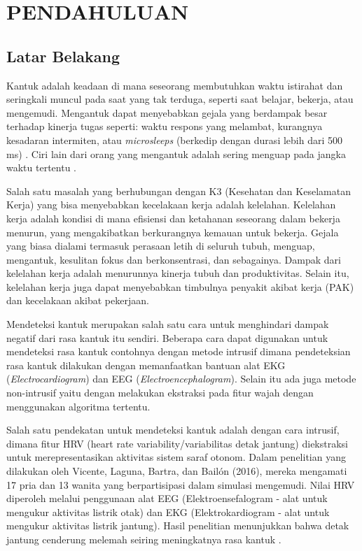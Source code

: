 \chapter{PENDAHULUAN}
\label{chap:pendahuluan}


\section{Latar Belakang}
\label{sec:latarbelakang}

Kantuk adalah keadaan di mana seseorang membutuhkan waktu istirahat dan seringkali
muncul pada saat yang tak terduga, seperti saat belajar, bekerja, atau mengemudi.
Mengantuk dapat menyebabkan gejala yang
berdampak besar terhadap kinerja tugas seperti: waktu respons
yang melambat, kurangnya kesadaran intermiten, atau \emph{microsleeps}
(berkedip dengan durasi lebih dari 500 ms) \parencite{2}. Ciri
lain dari orang yang mengantuk adalah sering menguap pada jangka
waktu tertentu \parencite{3}.

Salah satu masalah yang berhubungan dengan K3 (Kesehatan dan Keselamatan Kerja) yang bisa
menyebabkan kecelakaan kerja adalah kelelahan. Kelelahan kerja adalah kondisi di mana
efisiensi dan ketahanan seseorang dalam bekerja menurun, yang mengakibatkan
berkurangnya kemauan untuk bekerja. Gejala yang biasa dialami termasuk perasaan letih di
seluruh tubuh, menguap, mengantuk, kesulitan fokus dan berkonsentrasi, dan sebagainya.
Dampak dari kelelahan kerja adalah menurunnya kinerja tubuh dan produktivitas. Selain itu,
kelelahan kerja juga dapat menyebabkan timbulnya penyakit akibat kerja (PAK) dan
kecelakaan akibat pekerjaan\parencite{31}.

Mendeteksi kantuk merupakan salah satu cara untuk menghindari
dampak negatif dari rasa kantuk itu sendiri. Beberapa cara dapat
digunakan untuk mendeteksi rasa kantuk contohnya dengan metode
intrusif dimana pendeteksian rasa kantuk dilakukan dengan memanfaatkan
bantuan alat EKG (\emph{Electrocardiogram}) dan EEG (\emph{Electroencephalogram}).
Selain itu ada juga metode non-intrusif yaitu dengan melakukan ekstraksi pada
fitur wajah dengan menggunakan algoritma tertentu.

Salah satu pendekatan untuk mendeteksi kantuk adalah dengan cara intrusif, dimana fitur
HRV (heart rate variability/variabilitas detak jantung) diekstraksi untuk
merepresentasikan aktivitas sistem saraf otonom. Dalam penelitian yang dilakukan oleh
Vicente, Laguna, Bartra, dan Bailón (2016), mereka mengamati 17 pria dan 13 wanita yang
berpartisipasi dalam simulasi mengemudi. Nilai HRV diperoleh melalui penggunaan alat EEG
(Elektroensefalogram - alat untuk mengukur aktivitas listrik otak) dan EKG
(Elektrokardiogram - alat untuk mengukur aktivitas listrik jantung). Hasil penelitian
menunjukkan bahwa detak jantung cenderung melemah seiring meningkatnya rasa kantuk
\parencite{32}.

